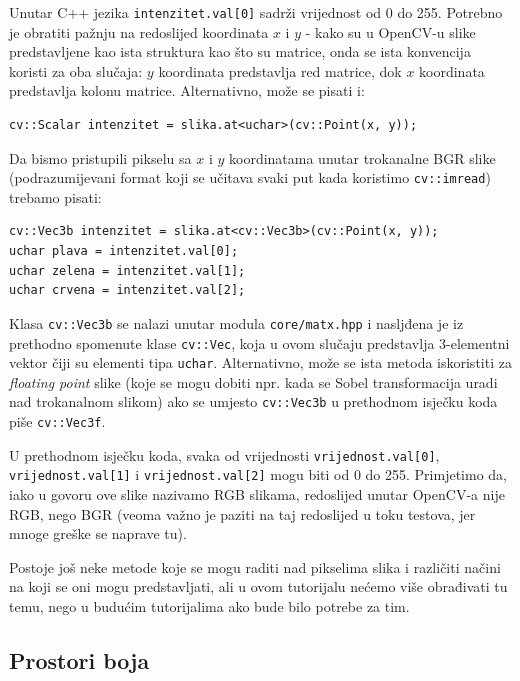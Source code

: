 \documentclass[a4paper, 12pt]{article}
\begin{document}
Unutar C++ jezika \lstinline{intenzitet.val[0]} sadrži vrijednost od 0 do 255. Potrebno je obratiti pažnju na redoslijed koordinata $x$ i $y$ - kako su u OpenCV-u slike predstavljene kao ista struktura kao što su matrice, onda se ista konvencija koristi za oba slučaja: $y$ koordinata predstavlja red matrice, dok $x$ koordinata predstavlja kolonu matrice. Alternativno, može se pisati i:

\begin{lstlisting}
cv::Scalar intenzitet = slika.at<uchar>(cv::Point(x, y));
\end{lstlisting}

Da bismo pristupili pikselu sa $x$ i $y$ koordinatama unutar trokanalne BGR slike (podrazumijevani format koji se učitava svaki put kada koristimo \lstinline{cv::imread}) trebamo pisati:

\begin{lstlisting}
cv::Vec3b intenzitet = slika.at<cv::Vec3b>(cv::Point(x, y));
uchar plava = intenzitet.val[0];
uchar zelena = intenzitet.val[1];
uchar crvena = intenzitet.val[2];
\end{lstlisting}

Klasa \lstinline{cv::Vec3b} se nalazi unutar modula \lstinline{core/matx.hpp} i nasljđena je iz prethodno spomenute klase \lstinline{cv::Vec}, koja u ovom slučaju predstavlja 3-elementni vektor čiji su elementi tipa \lstinline{uchar}. Alternativno, može se ista metoda iskoristiti za \textit{floating point} slike (koje se mogu dobiti npr. kada se Sobel transformacija uradi nad trokanalnom slikom) ako se umjesto \lstinline{cv::Vec3b} u prethodnom isječku koda piše \lstinline{cv::Vec3f}.

U prethodnom isječku koda, svaka od vrijednosti \lstinline{vrijednost.val[0]}, \lstinline{vrijednost.val[1]} i \lstinline{vrijednost.val[2]} mogu biti od 0 do 255. Primjetimo da, iako u govoru ove slike nazivamo RGB slikama, redoslijed unutar OpenCV-a nije RGB, nego BGR (veoma važno je paziti na taj redoslijed u toku testova, jer mnoge greške se naprave tu).

Postoje još neke metode koje se mogu raditi nad pikselima slika i različiti načini na koji se oni mogu predstavljati, ali u ovom tutorijalu nećemo više obrađivati tu temu, nego u budućim tutorijalima ako bude bilo potrebe za tim. 

\subsection*{Prostori boja}
\end{document}
